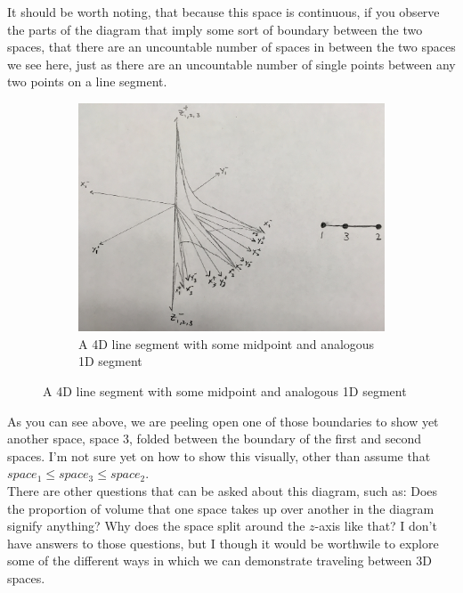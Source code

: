 \documentclass[20pt]{article} %
\begin{document}
\newpage
It should be worth noting, that because this space is continuous, if you observe the parts of the diagram that imply some sort of boundary between the two spaces, that there are an uncountable number of spaces in between the two spaces we see here, just as there are an uncountable number of single points between any two points on a line segment.

\begin{figure}[!htbp]
  	\centering
   	\begin{subfigure}[p]{1.0\linewidth}
    	\includegraphics[width=\linewidth]{./figures/fig4.jpg}
	\caption{A 4D line segment with some midpoint and analogous 1D segment}
	\label{fig:sub1}
   	\end{subfigure}
\end{figure} 

As you can see above, we are peeling open one of those boundaries to show yet another space, space $3$, folded between the boundary of the first and second spaces.  I'm not sure yet on how to show this visually, other than assume that $space_1 \leq space_3 \leq space_2$. \\ 

\newpage
There are other questions that can be asked about this diagram, such as: Does the proportion of volume that one space takes up over another in the diagram signify anything? Why does the space split around the $z$-axis like that? I don't have answers to those questions, but I though it would be worthwile to explore some of the different ways in which we can demonstrate traveling between 3D spaces.
\end{document}

